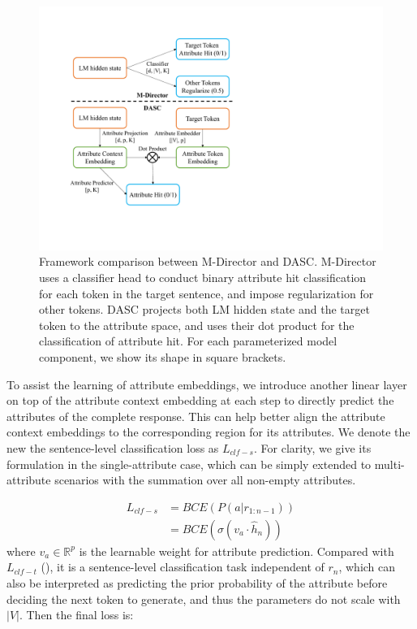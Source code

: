 \begin{figure}[t]
    \centering
    \includegraphics[width=1.0\columnwidth]{figures/dasc_illustration.pdf}
    \caption{Framework comparison between M-Director and DASC. M-Director uses a classifier head to conduct binary attribute hit classification for each token in the target sentence, and impose regularization for other tokens. 
DASC projects both LM hidden state and the target token to the attribute space, and uses their dot product for the classification of attribute hit. 
For each parameterized model component, we show its shape in square brackets.}
    \label{fig:dasc_illustration}
\end{figure}

To assist the learning of attribute embeddings, we introduce another linear layer on top of the attribute context embedding at each step to directly predict the attributes of the complete response. This can help better align the attribute context embeddings to the corresponding region for its attributes. We denote the new the sentence-level classification loss as $L_{clf-s}$. For clarity, we give its formulation in the single-attribute case, which can be simply extended to multi-attribute scenarios with the summation over all non-empty attributes.

\begin{equation}
    \begin{aligned}
        L_{clf-s} &= BCE(P(a | r_{1:n-1})) \\
                  &= BCE(\sigma(v_a \cdot \hat h_n))
    \end{aligned}
\end{equation}
where $v_a \in \mathbb{R}^{p}$ is the learnable weight for attribute prediction. Compared with $L_{clf-t}$ (), it is a sentence-level classification task independent of $r_n$, which can also be interpreted as predicting the prior probability of the attribute before deciding the next token to generate, and thus the parameters do not scale with $|V|$. Then the final loss is: 

